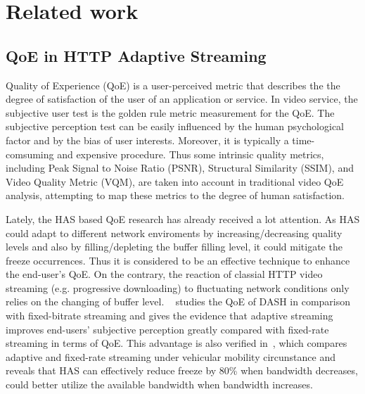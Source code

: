 \documentclass[journal]{IEEEtran}
\begin{document}
\section {Related work}
\label{sec:related_work}
\subsection{QoE in HTTP Adaptive Streaming}

Quality of Experience (QoE) is a user-perceived metric that describes the the degree of satisfaction of the user of an application or service. In video service, the subjective user test is the golden rule metric measurement for the QoE. %
The subjective perception test can be easily influenced by the human psychological factor and by the bias of user interests. Moreover, it is typically a time-comsuming and expensive procedure. Thus some intrinsic quality metrics, including Peak Signal to Noise Ratio (PSNR), Structural Similarity (SSIM), and Video Quality Metric (VQM), are taken into account in traditional video QoE analysis, attempting to map these metrics to the degree of human satisfaction. 

Lately, the HAS based QoE research has already received a lot attention. As HAS could adapt to different network enviroments by increasing/decreasing quality levels and also by filling/depleting the buffer filling level, it could mitigate the freeze occurrences. Thus it is considered to be an effective technique to enhance the end-user's QoE. On the contrary, the reaction of classial HTTP video streaming (e.g. progressive downloading) to fluctuating network conditions only relies on the changing of buffer level. ~\cite{yitong2013study} studies the QoE of DASH in comparison with fixed-bitrate streaming and gives the evidence that adaptive streaming improves end-users' subjective perception greatly compared with fixed-rate streaming in terms of QoE. This advantage is also verified in~\cite{yao2011empirical}, which compares adaptive and fixed-rate streaming under vehicular mobility circunstance and reveals that HAS can effectively reduce freeze by 80\% when bandwidth decreases, could better utilize the available bandwidth when bandwidth increases.
\end{document}

